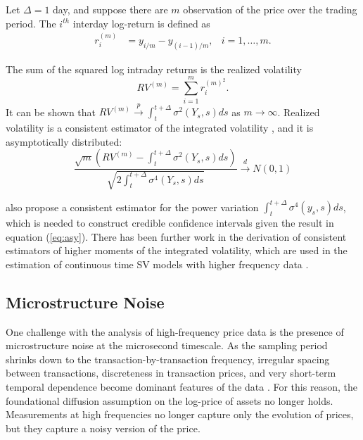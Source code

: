 Let $\Delta = 1$ day, and suppose there are $m$ observation of the price over the trading period. The $i^{th}$ interday log-return is defined as 
\begin{align*}
r_i^{(m)} &= y_{i/m} - y_{(i-1)/m}, &  i =1, \ldots, m.
\end{align*}

The sum of the squared log intraday returns is the realized volatility
\begin{equation}
	RV^{(m)} = \sum_{i=1}^m r_i^{(m)^2}. \label{eq:RV}
\end{equation}
It can be shown that $RV^{(m)} \xrightarrow{p} \int_t^{t+\Delta} \sigma^2(Y_s, s)ds$ as $m \to \infty$. Realized volatility is a consistent estimator of the integrated volatility \citep*{barndorff2002econometric}, and it is asymptotically distributed:
\begin{equation}
 \frac{\sqrt{m} (RV^{(m)} - \int_{t}^{t+\Delta} \sigma^2(Y_s,s)ds)}{\sqrt{ 2\int_{t}^{t+\Delta} \sigma^4(Y_s,s)ds} } \xrightarrow{d} N(0,1) \label{eq:asy}
\end{equation}

\cite{barndorff2004power} also propose a consistent estimator for the power variation $\int_{t}^{t+\Delta} \sigma^4(y_s,s)ds$, which is needed to construct credible confidence intervals given the result in equation (\ref{eq:asy}). There has been further work in the derivation of consistent estimators of higher moments of the integrated volatility, which are used in the estimation of continuous time SV models with higher frequency data \citep*{todorov2011econometric}.


	\subsection{Microstructure Noise}
One challenge with the analysis of high-frequency price data is the presence of microstructure noise at the microsecond timescale. As the sampling period shrinks down to the transaction-by-transaction frequency, irregular spacing between transactions, discreteness in transaction prices, and very short-term temporal dependence become dominant features of the data \citep*{stoll2000presidential}. For this reason, the foundational diffusion assumption on the log-price of assets no longer holds. Measurements at high frequencies no longer capture only the evolution of prices, but they capture a noisy version of the price. 

